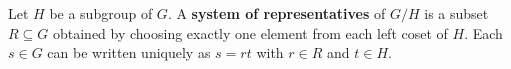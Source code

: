 Let $H$ be a subgroup of $G$. A \textbf{system of representatives} of $G/H$ is a subset $R \subseteq G$ obtained by choosing exactly one element from each left coset of $H$. Each $s \in G$ can be written uniquely as $s = rt$ with $r \in R$ and $t \in H$.
